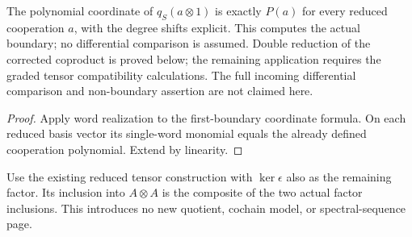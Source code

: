 \begin{proposition}
  \label{prop:h6-first-boundary-polynomial}
  \leanok
  The polynomial coordinate of $q_S(a\otimes1)$ is exactly $P(a)$ for
  every reduced cooperation $a$, with the degree shifts explicit.
  This computes the actual boundary; no differential comparison is
  assumed. Double reduction of the corrected coproduct is proved below;
  the remaining application requires the graded tensor compatibility calculations.
  The full incoming differential comparison and non-boundary assertion
  are not claimed here.
\end{proposition}
\begin{proof}
  Apply word realization to the first-boundary coordinate formula.
  On each reduced basis vector its single-word monomial equals the
  already defined cooperation polynomial. Extend by linearity.
  \leanok
\end{proof}

\begin{definition}
  \label{def:h6-double-reduced-cooperations}
  \leanok
  Use the existing reduced tensor construction with $\ker\epsilon$ also
  as the remaining factor. Its inclusion into $A\otimes A$ is the
  composite of the two actual factor inclusions. This introduces no
  new quotient, cochain model, or spectral-sequence page.
\end{definition}

